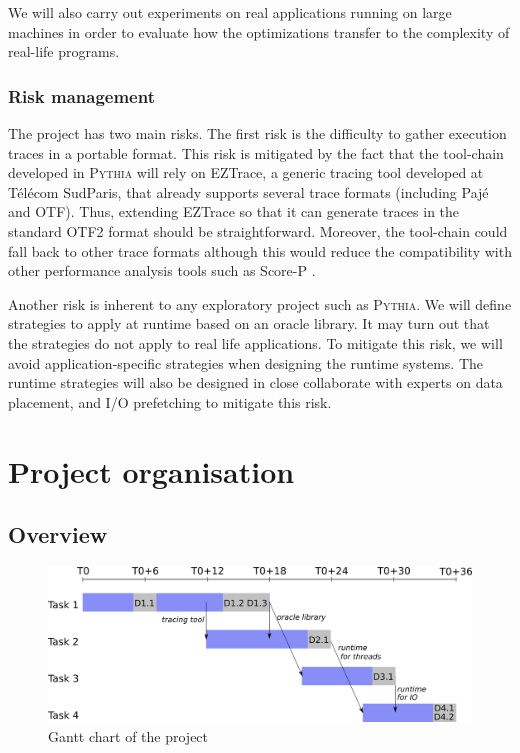 \documentclass[a4paper,11pt,defblank]{article}
\newcommand{\pname}{\textsc{Pythia}\xspace}
\begin{document}
We will also carry out experiments on real applications running on
large machines in order to evaluate how the optimizations transfer to
the complexity of real-life programs.

\vspace{0.5cm}
\subsubsection{Risk management}
The project has two main risks. The first risk is the difficulty to
gather execution traces in a portable format. This risk is mitigated
by the fact that the tool-chain developed in \pname will rely on
EZTrace, a generic tracing tool developed at Télécom SudParis, that
already supports several trace formats (including Pajé and OTF). Thus,
extending EZTrace so that it can generate traces in the standard OTF2
format should be straightforward. Moreover, the tool-chain could fall
back to other trace formats although this would reduce the
compatibility with other performance analysis tools such as Score-P \cite{scorep}.

Another risk is inherent to any exploratory project such as \pname. We
will define strategies to apply at runtime based on an oracle
library. It may turn out that the strategies do not apply to real life
applications. To mitigate this risk, we will avoid
application-specific strategies when designing the runtime
systems. The runtime strategies will also be designed in close
collaborate with experts on data placement, and I/O prefetching to
mitigate this risk.

\vspace{0.5cm}
\section{Project organisation}
\subsection{Overview}

\begin{figure}[h]
  \centering
  \includegraphics[width=0.8\linewidth]{figures/gantt.png}
  \caption{Gantt chart of the project}
  \label{fig:gantt}
\end{figure}
\end{document}
